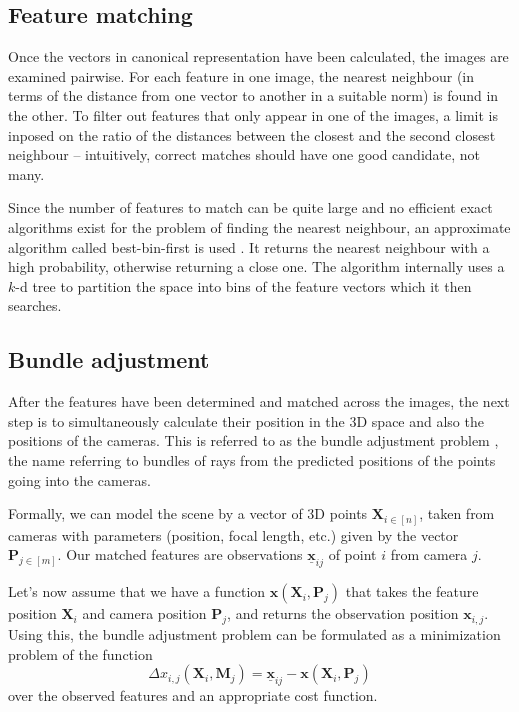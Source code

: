 \subsection{Feature matching}
Once the vectors in canonical representation have been calculated, the images are examined pairwise.
For each feature in one image, the nearest neighbour (in terms of the distance from one vector to another in a suitable norm) is found in the other.
To filter out features that only appear in one of the images, a limit is inposed on the ratio of the distances between the closest and the second closest neighbour -- intuitively, correct matches should have one good candidate, not many.

Since the number of features to match can be quite large and no efficient exact algorithms exist for the problem of finding the nearest neighbour, an approximate algorithm called best-bin-first is used \cite{beis1997shape}.
It returns the nearest neighbour with a high probability, otherwise returning a close one.
The algorithm internally uses a $k$-d tree to partition the space into bins of the feature vectors which it then searches.

\subsection{Bundle adjustment}
After the features have been determined and matched across the images, the next step is to simultaneously calculate their position in the 3D space and also the positions of the cameras.
This is referred to as the bundle adjustment problem \cite{snavely2008modeling,schneider19913}, the name referring to bundles of rays from the predicted positions of the points going into the cameras.

Formally, we can model the scene by a vector of 3D points $\mathbf{X}_{i \in [n]}$, taken from cameras with parameters (position, focal length, etc.) given by the vector $\mathbf{P}_{j \in [m]}$.
Our matched features are observations $\underline{\bm{x}}_{ij}$ of point $i$ from camera $j$.

Let's now assume that we have a function $\bm{x}(\mathbf{X}_i, \mathbf{P}_j)$ that takes the feature position $\mathbf{X}_i$ and camera position $\mathbf{P}_j$, and returns the observation position $\mathbf{x}_{i, j}$.
Using this, the bundle adjustment problem can be formulated as a minimization problem of the function \begin{equation} \Delta x_{i, j} (\mathbf{X}_i, \mathbf{M}_j) = \underline{\bm{x}}_{ij} - \bm{x}(\mathbf{X}_i, \mathbf{P}_j) \end{equation}
over the observed features and an appropriate cost function.

